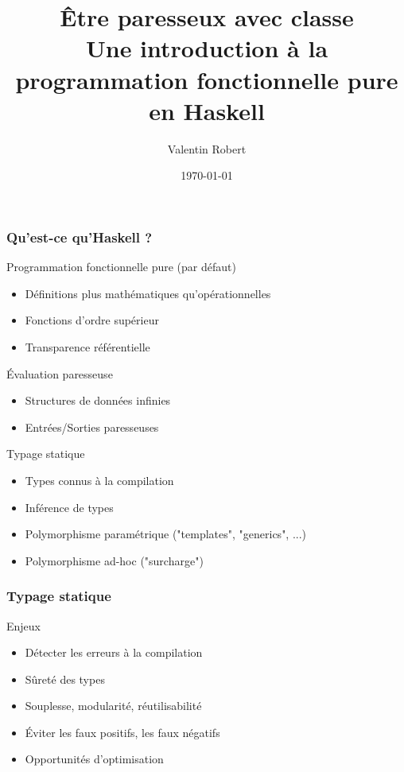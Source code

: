 \documentclass[10pt]{beamer}
\title[Haskell]{Être paresseux avec classe\\
Une introduction à la programmation fonctionnelle pure en Haskell}
\author{Valentin Robert}
\institute{INRIA}
\date{\today}
\begin{document}
\begin{frame}
\titlepage
\end{frame}



\begin{frame}
\frametitle{Qu'est-ce qu'Haskell ?}

\begin{block}
{Programmation fonctionnelle pure (par défaut)}
\begin{itemize}
\item Définitions plus mathématiques qu'opérationnelles
\item Fonctions d'ordre supérieur
\item Transparence référentielle
\end{itemize}
\end{block}

\pause

\begin{block}
{Évaluation paresseuse}
\begin{itemize}
\item Structures de données infinies
\item Entrées/Sorties paresseuses
\end{itemize}
\end{block}

\pause

\begin{block}
{Typage statique}
\begin{itemize}
\item Types connus à la compilation
\item Inférence de types
\item Polymorphisme paramétrique ("templates", "generics", ...)
\item Polymorphisme ad-hoc ("surcharge")
\end{itemize}
\end{block}
\end{frame}



\begin{frame}
\frametitle{Typage statique}
\begin{block}
{Enjeux}
\begin{itemize}
\item Détecter les erreurs à la compilation
\item Sûreté des types
\item Souplesse, modularité, réutilisabilité
\item Éviter les faux positifs, les faux négatifs
\item Opportunités d'optimisation
\end{itemize}
\end{block}
\end{frame}
\end{document}
